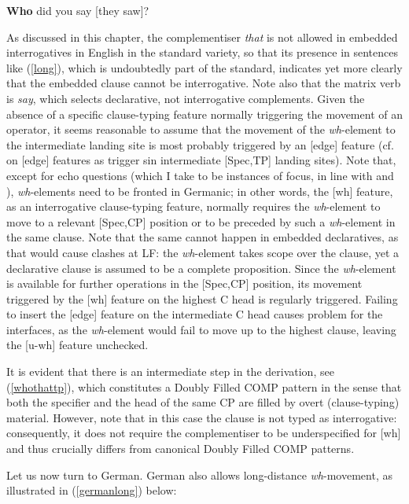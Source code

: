 \ea \textbf{Who} did you say [they saw]? \label{longzero}
\z

As discussed in this chapter, the complementiser \textit{that} is not allowed in embedded interrogatives in English in the standard variety, so that its presence in sentences like (\ref{long}), which is undoubtedly part of the standard, indicates yet more clearly that the embedded clause cannot be interrogative. Note also that the matrix verb is \textit{say}, which selects declarative, not interrogative complements. Given the absence of a specific clause-typing feature normally triggering the movement of an operator, it seems reasonable to assume that the movement of the \textit{wh}-element to the intermediate landing site is most probably triggered by an [edge] feature (cf. \citealt{georgi2013} on [edge] features as trigger sin intermediate [Spec,TP] landing sites). Note that, except for echo questions (which I take to be instances of focus, in line with \citealt{boskovic2002} and \citealt{artstein2002}), \textit{wh}-elements need to be fronted in Germanic; in other words, the [wh] feature, as an interrogative clause-typing feature, normally requires the \textit{wh}-element to move to a relevant [Spec,CP] position or to be preceded by such a \textit{wh}-element in the same clause. Note that the same cannot happen in embedded declaratives, as that would cause clashes at LF: the \textit{wh}-element takes scope over the clause, yet a declarative clause is assumed to be a complete proposition. Since the \textit{wh}-element is available for further operations in the [Spec,CP] position, its movement triggered by the [wh] feature on the highest C head is regularly triggered. Failing to insert the [edge] feature on the intermediate C head causes problem for the interfaces, as the \textit{wh}-element would fail to move up to the highest clause, leaving the [u-wh] feature unchecked.

It is evident that there is an intermediate step in the derivation, see (\ref{whothattp}), which constitutes a Doubly Filled COMP pattern in the sense that both the specifier and the head of the same CP are filled by overt (clause-typing) material. However, note that in this case the clause is not typed as interrogative: consequently, it does not require the complementiser to be underspecified for [wh] and thus crucially differs from canonical Doubly Filled COMP patterns.

Let us now turn to German. German also allows long-distance \textit{wh}-movement, as illustrated in (\ref{germanlong}) below:

